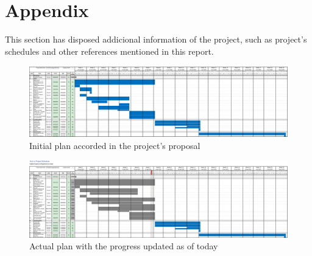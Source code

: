 %
%

\chapter{Appendix}

This section has disposed addicional information of the project, such as project's 
schedules and other references mentioned in this report.

\begin{landscape}    
    
\end{landscape}

\begin{landscape}
    \begin{figure}
        \centering 
        \includegraphics[scale=0.3]{_figures/Project_initial_plan.eps}
        \caption{Initial plan accorded in the project's proposal}
    \end{figure}  
\end{landscape}

\begin{landscape}
    \begin{figure}
        \centering 
        \includegraphics[scale=0.3]{_figures/Project_actual_plan.eps}
        \caption{Actual plan with the progress updated as of today}
    \end{figure}  
\end{landscape}